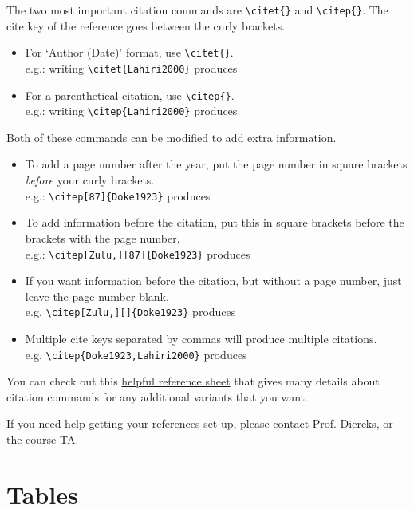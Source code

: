 \documentclass[output=paper,colorlinks,citecolor=brown]{langscibook}
\begin{document}
The two most important citation commands are \verb|\citet{}| and \verb|\citep{}|. The cite key of the reference goes between the curly brackets.
 
 \begin{itemize}
 \item For `Author (Date)' format, use \verb|\citet{}|. \\
  e.g.: writing \verb|\citet{Lahiri2000}| produces \citet{Lahiri2000}
 \item For a parenthetical citation, use \verb|\citep{}|.\\
 e.g.: writing \verb|\citep{Lahiri2000}| produces \citep{Lahiri2000}
 \end{itemize}

\noindent Both of these commands can be modified to add extra information.
 
 \begin{itemize}
 \item To add a page number after the year, put the page number in square brackets \textit{before} your curly brackets.\\
 e.g.: \verb|\citep[87]{Doke1923}| produces \citep[87]{Doke1923} 
 \item To add information before the citation, put this in square brackets before the brackets with the page number.\\
  e.g.: \verb|\citep[Zulu,][87]{Doke1923}| produces \citep[Zulu,][87]{Doke1923} 
  \item If you want information before the citation, but without a page number, just leave the page number blank.\\ 
  e.g. \verb|\citep[Zulu,][]{Doke1923}| produces \citep[Zulu,][]{Doke1923}
  \item Multiple cite keys separated by commas will produce multiple citations.\\
  e.g. \verb|\citep{Doke1923,Lahiri2000}| produces \citep{Doke1923,Lahiri2000}
 \end{itemize}
 

\noindent You can check out this \href{http://merkel.texture.rocks/Latex/natbib.php}{helpful reference sheet} that gives many details about citation commands for any additional variants that you want. %

If you need help getting your references set up, please contact Prof. Diercks, or the course TA.

\section{Tables}
\end{document}
